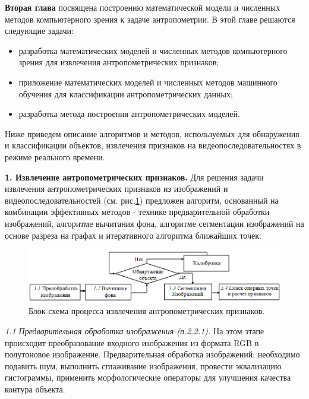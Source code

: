  \textbf{Вторая глава} посвящена построению математической модели и численных методов компьютерного зрения к задаче антропометрии. В этой главе решаются следующие задачи:
\begin{itemize}
	\item разработка математических моделей и численных методов компьютерного зрения для извлечения антропометрических признаков;
	\item приложение математических моделей и численных методов машинного обучения для классификации антропометрических данных;
	\item разработка метода построения антропометрических моделей.
\end{itemize}

Ниже приведем описание алгоритмов и методов, используемых для обнаружения и классификации объектов, извлечения признаков на видеопоследовательностях в режиме реального времени.

\textbf{1. Извлечение антропометрических признаков.} Для решения задачи извлечения антропометрических признаков из изображений и видеопоследовательностей (см. рис.\ref{img53}) предложен алгоритм, основанный на комбинации эффективных методов - технике предварительной обработки изображений, алгоритме вычитания фона, алгоритме сегментации изображений на основе разреза на графах и итеративного алгоритма ближайших точек.
\begin{figure}[ht!]
\centering
\includegraphics [width=1\linewidth] {images/h53.png}
\begin{center}
\caption{Блок-схема процесса извлечения антропометрических признаков.} \label{img53}
\end{center}
\end{figure}

\textit{1.1 Предварительная обработка изображения (п.2.2.1).} На этом этапе происходит преобразование входного изображения из формата RGB в полутоновое изображение. Предварительная обработка изображений: необходимо подавить шум, выполнить сглаживание изображения, провести эквализацию гистограммы, применить морфологические операторы для улучшения качества контура объекта.


